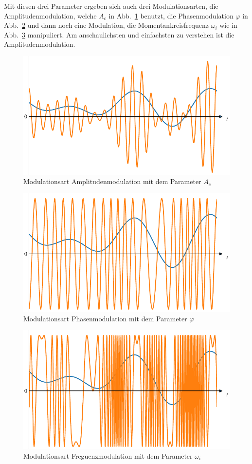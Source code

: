 Mit diesen drei Parameter ergeben sich auch drei Modulationsarten,
die Amplitudenmodulation, welche \(A_c\) in Abb.~\ref{fig:fm:AM} benutzt, 
die Phasenmodulation \(\varphi\) in Abb.~\ref{fig:fm:PM} und dann noch
eine Modulation, die Momentankreisfrequenz \(\omega_i\) wie in
Abb.~\ref{fig:fm:FM} manipuliert.
Am anschaulichsten und einfachsten zu verstehen ist die
Amplitudenmodulation.

\begin{figure}
    \centering
	\includegraphics{papers/fm/images/am.pdf}
	\caption{Modulationsart Amplitudenmodulation mit dem Parameter \(A_c\)}
	\label{fig:fm:AM}
\end{figure}

\begin{figure}
    \centering
	\includegraphics{papers/fm/images/pm.pdf}
	\caption{Modulationsart Phasenmodulation mit dem Parameter \(\varphi\)}
	\label{fig:fm:PM}
\end{figure}

\begin{figure}
    \centering
	\includegraphics{papers/fm/images/fm.pdf}
	\caption{Modulationsart Freguenzmodulation mit dem Parameter \(\omega_i\)}
	\label{fig:fm:FM}
\end{figure}






